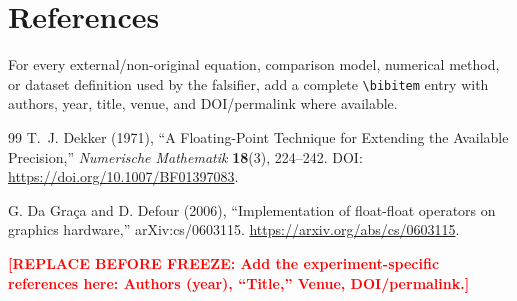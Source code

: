 \documentclass[11pt,a4paper]{article}
\newcommand{\SSTTODO}[1]{\ifmmode\text{\color{red}\bfseries TODO}\else\textcolor{red}{\textbf{[REPLACE BEFORE FREEZE: #1]}}\fi}
\begin{document}
\section{References}
For every external/non-original equation, comparison model, numerical method, or dataset definition used by the falsifier, add a complete \verb|\bibitem| entry with authors, year, title, venue, and DOI/permalink where available.

\begin{thebibliography}{99}
T.~J. Dekker (1971), ``A Floating-Point Technique for Extending the Available Precision,'' \emph{Numerische Mathematik} \textbf{18}(3), 224--242. DOI: \url{https://doi.org/10.1007/BF01397083}.

G. Da Gra\c{c}a and D. Defour (2006), ``Implementation of float-float operators on graphics hardware,'' arXiv:cs/0603115. \url{https://arxiv.org/abs/cs/0603115}.

\SSTTODO{Add the experiment-specific references here: Authors (year), ``Title,'' Venue, DOI/permalink.}
\end{thebibliography}
\end{document}
